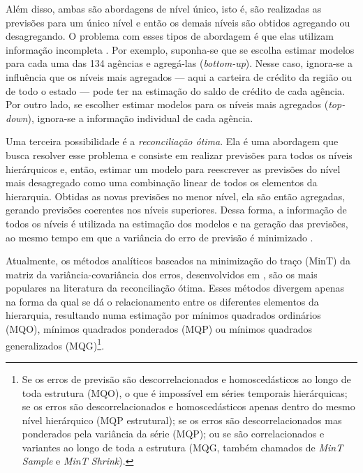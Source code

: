 \documentclass[
  12pt,
  twoside,
  openright,
  a4paper,
  chapter=TITLE,
  section=TITLE,
  brazil]{abntex2}
\begin{document}
Além disso, ambas são abordagens de nível único, isto é, são realizadas
as previsões para um único nível e então os demais níveis são obtidos
agregando ou desagregando. O problema com esses tipos de abordagem é que
elas utilizam informação incompleta \autocite{hyndman_forecasting_2021}.
Por exemplo, suponha-se que se escolha estimar modelos para cada uma das
134 agências e agregá-las (\emph{bottom-up}). Nesse caso, ignora-se a
influência que os níveis mais agregados --- aqui a carteira de crédito
da região ou de todo o estado --- pode ter na estimação do saldo de
crédito de cada agência. Por outro lado, se escolher estimar modelos
para os níveis mais agregados (\emph{top-down}), ignora-se a informação
individual de cada agência.

Uma terceira possibilidade é a \emph{reconciliação ótima}. Ela é uma
abordagem que busca resolver esse problema e consiste em realizar
previsões para todos os níveis hierárquicos e, então, estimar um modelo
para reescrever as previsões do nível mais desagregado como uma
combinação linear de todos os elementos da hierarquia. Obtidas as novas
previsões no menor nível, ela são então agregadas, gerando previsões
coerentes nos níveis superiores. Dessa forma, a informação de todos os
níveis é utilizada na estimação dos modelos e na geração das previsões,
ao mesmo tempo em que a variância do erro de previsão é minimizado
\autocite{hyndman_optimal_2011}.

Atualmente, os métodos analíticos baseados na minimização do traço
(MinT) da matriz da variância-covariância dos erros, desenvolvidos em
\textcite{wickramasuriya_optimal_2019}, são os mais populares na
literatura da reconciliação ótima. Esses métodos divergem apenas na
forma da qual se dá o relacionamento entre os diferentes elementos da
hierarquia, resultando numa estimação por mínimos quadrados ordinários
(MQO), mínimos quadrados ponderados (MQP) ou mínimos quadrados
generalizados (MQG)\footnote{Se os erros de previsão são
  descorrelacionados e homoscedásticos ao longo de toda estrutura (MQO),
  o que é impossível em séries temporais hierárquicas; se os erros são
  descorrelacionados e homoscedásticos apenas dentro do mesmo nível
  hierárquico (MQP estrutural); se os erros são descorrelacionados mas
  ponderados pela variância da série (MQP); ou se são correlacionados e
  variantes ao longo de toda a estrutura (MQG, também chamados de
  \emph{MinT Sample} e \emph{MinT Shrink}).}.
\end{document}
